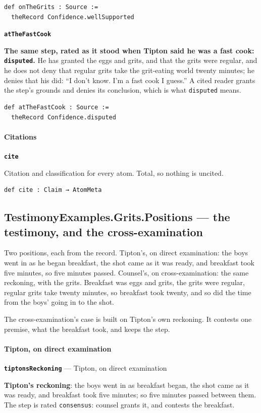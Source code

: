 \documentclass[11pt]{article}
\begin{document}
{\small\begin{verbatim}
def onTheGrits : Source :=
  theRecord Confidence.wellSupported
\end{verbatim}}
\par\medskip\noindent\textbf{\texttt{at\allowbreak{}The\allowbreak{}Fast\allowbreak{}Cook}}\par\nobreak\noindent
\textbf{The same step, rated as it stood when Tipton said he was a fast cook: \texttt{disputed}.} He has granted the eggs and grits, and that the grits were regular, and he does not deny that regular grits take the grit-eating world twenty minutes; he denies that his did: “I don’t know. I’m a fast cook I guess.” A cited reader grants the step’s grounds and denies its conclusion, which is what \texttt{disputed} means.

{\small\begin{verbatim}
def atTheFastCook : Source :=
  theRecord Confidence.disputed
\end{verbatim}}
\paragraph*{Citations}
\leavevmode\par\nobreak
\par\medskip\noindent\textbf{\texttt{cite}}\par\nobreak\noindent
Citation and classification for every atom. Total, so nothing is uncited.

{\small\begin{verbatim}
def cite : Claim → AtomMeta
\end{verbatim}}
\subsection*{TestimonyExamples.Grits.Positions — the testimony, and the cross-examination}
Two positions, each from the record. Tipton’s, on direct examination: the boys went in as he began breakfast, the shot came as it was ready, and breakfast took five minutes, so five minutes passed. Counsel’s, on cross-examination: the same reckoning, with the grits. Breakfast was eggs and grits, the grits were regular, regular grits take twenty minutes, so breakfast took twenty, and so did the time from the boys’ going in to the shot.

The cross-examination’s case is built on Tipton’s own reckoning. It contests one premise, what the breakfast took, and keeps the step.

\paragraph*{Tipton, on direct examination}
\leavevmode\par\nobreak
\par\medskip\noindent\textbf{\texttt{tiptons\allowbreak{}Reckoning}} --- Tipton, on direct examination\par\nobreak\noindent
\textbf{Tipton’s reckoning}: the boys went in as breakfast began, the shot came as it was ready, and breakfast took five minutes; so five minutes passed between them. The step is rated \texttt{consensus}: counsel grants it, and contests the breakfast.
\end{document}
